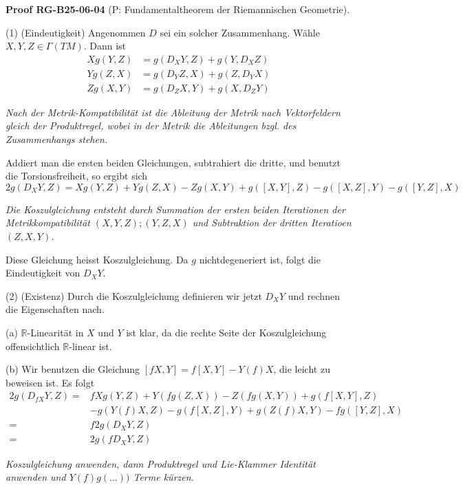 \documentclass[10pt, letterpaper]{article}
\newenvironment{note}{\par\begingroup\color{hellblau}\itshape}{\par\endgroup}
\newcommand{\CustomHeading}[3]{%
  \par\medskip\noindent%
  \textbf{#1 #2} \textnormal{(#3)}.\enskip%
}
\newenvironment{PROOF}[2]{\begin{unitbox}\CustomHeading{Proof}{#1}{#2}}{\end{unitbox}}
\begin{document}
\begin{PROOF}{RG-B25-06-04}{P: Fundamentaltheorem der Riemannischen Geometrie}
(1) (Eindeutigkeit) Angenommen $D$ sei ein solcher Zusammenhang. Wähle $X, Y, Z \in \Gamma(T M)$. Dann ist
$$
\begin{aligned}
X g(Y, Z) & =g\left(D_{X} Y, Z\right)+g\left(Y, D_{X} Z\right) \\
Y g(Z, X) & =g\left(D_{Y} Z, X\right)+g\left(Z, D_{Y} X\right) \\
Z g(X, Y) & =g\left(D_{Z} X, Y\right)+g\left(X, D_{Z} Y\right)
\end{aligned}
$$
\begin{note}
  Nach der Metrik-Kompatibilität ist die Ableitung der Metrik nach Vektorfeldern gleich der Produktregel, wobei in der Metrik die Ableitungen bzgl. des Zusammenhangs stehen.
\end{note}
Addiert man die ersten beiden Gleichungen, subtrahiert die dritte, und benutzt die Torsionsfreiheit, so ergibt sich
$$2 g\left(D_{X} Y, Z\right)=X g(Y, Z)+Y g(Z, X)-Z g(X, Y)+g([X, Y], Z)-g([X, Z], Y)-g([Y, Z], X)$$
\begin{note}
  Die Koszulgleichung entsteht durch Summation der ersten beiden Iterationen der Metrikkompatibilität $(X,Y,Z);(Y,Z,X)$ und Subtraktion der dritten Iteratioen $(Z,X,Y)$.
\end{note}
Diese Gleichung heisst Koszulgleichung. Da $g$ nichtdegeneriert ist, folgt die Eindeutigkeit von $D_{X} Y$.



(2) (Existenz) Durch die Koszulgleichung definieren wir jetzt $D_{X} Y$ und rechnen die Eigenschaften nach.

(a) $\mathbb{R}$-Linearität in $X$ und $Y$ ist klar, da die rechte Seite der Koszulgleichung offensichtlich $\mathbb{R}$-linear ist.

(b) Wir benutzen die Gleichung $[f X, Y]=f[X, Y]-Y(f) X$, die leicht zu beweisen ist. Es folgt
$$
\begin{aligned}
2 g\left(D_{f X} Y, Z\right)= & f X g(Y, Z)+Y(f g(Z, X))-Z(f g(X, Y))+g(f[X, Y], Z) \\
& -g(Y(f) X, Z)-g(f[X, Z], Y)+g(Z(f) X, Y)-f g([Y, Z], X) \\
= & f 2 g\left(D_{X} Y, Z\right) \\
= & 2 g\left(f D_{X} Y, Z\right)
\end{aligned}
$$
\begin{note}
Koszulgleichung anwenden, dann Produktregel und Lie-Klammer Identität anwenden und $Y(f)g(\dots))$ Terme kürzen.
\end{note}


\end{PROOF}
\end{document}

